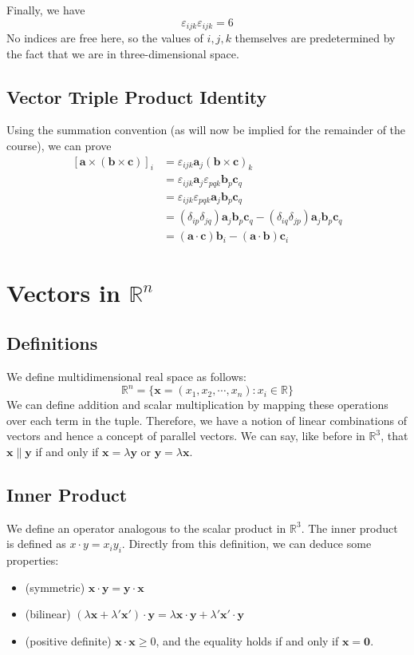 \documentclass{article}
\begin{document}
Finally, we have
\[ \varepsilon_{ijk}\varepsilon_{ijk} = 6 \]
No indices are free here, so the values of $i, j, k$ themselves are predetermined by the fact that we are in three-dimensional space.

\subsection{Vector Triple Product Identity}
Using the summation convention (as will now be implied for the remainder of the course), we can prove
\begin{align*}
	\left[ \bm a \times (\bm b \times \bm c) \right]_i
	 & = \varepsilon_{ijk} \bm a_j (\bm b \times \bm c)_k                                                  \\
	 & = \varepsilon_{ijk} \bm a_j \varepsilon_{pqk} \bm b_p \bm c_q                                       \\
	 & = \varepsilon_{ijk}\varepsilon_{pqk} \bm a_j \bm b_p \bm c_q                                        \\
	 & = (\delta_{ip}\delta_{jq})\bm a_j \bm b_p \bm c_q - (\delta_{iq}\delta_{jp})\bm a_j \bm b_p \bm c_q \\
	 & = (\bm a \cdot \bm c) \bm b_i - (\bm a \cdot \bm b) \bm c_i
\end{align*}

\section{Vectors in $\mathbb R^n$}
\subsection{Definitions}
We define multidimensional real space as follows:
\[ \mathbb R^n = \{ \bm x = (x_1, x_2, \cdots, x_n) : x_i \in \mathbb R \} \]
We can define addition and scalar multiplication by mapping these operations over each term in the tuple. Therefore, we have a notion of linear combinations of vectors and hence a concept of parallel vectors. We can say, like before in $\mathbb R^3$, that $\bm x \parallel \bm y$ if and only if $\bm x = \lambda \bm y$ or $\bm y = \lambda \bm x$.

\subsection{Inner Product}
We define an operator analogous to the scalar product in $\mathbb R^3$. The inner product is defined as $x \cdot y = x_i y_i$. Directly from this definition, we can deduce some properties:
\begin{itemize}
	\item (symmetric) $\bm x \cdot \bm y = \bm y \cdot \bm x$
	\item (bilinear) $(\lambda \bm x + \lambda'\bm x')\cdot \bm y = \lambda \bm x\cdot \bm y + \lambda' \bm x' \cdot \bm y$
	\item (positive definite) $\bm x \cdot \bm x \geq 0$, and the equality holds if and only if $\bm x = \bm 0$.
\end{itemize}
\end{document}
